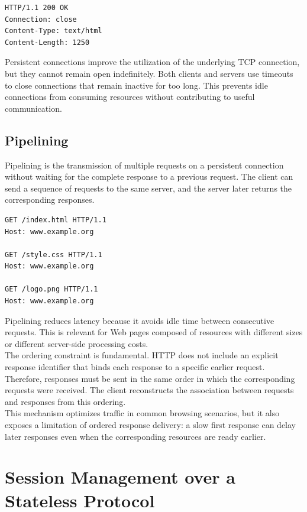 \documentclass{scrbook}
\begin{document}
\begin{lstlisting}
HTTP/1.1 200 OK
Connection: close
Content-Type: text/html
Content-Length: 1250
\end{lstlisting}

Persistent connections improve the utilization of the underlying TCP connection, but they cannot remain open indefinitely. Both clients and servers use timeouts to close connections that remain inactive for too long. This prevents idle connections from consuming resources without contributing to useful communication.

\newpage
\subsection{Pipelining}

Pipelining is the transmission of multiple requests on a persistent connection without waiting for the complete response to a previous request. The client can send a sequence of requests to the same server, and the server later returns the corresponding responses.

\begin{lstlisting}
GET /index.html HTTP/1.1
Host: www.example.org

GET /style.css HTTP/1.1
Host: www.example.org

GET /logo.png HTTP/1.1
Host: www.example.org
\end{lstlisting}

Pipelining reduces latency because it avoids idle time between consecutive requests. This is relevant for Web pages composed of resources with different sizes or different server-side processing costs.\\

The ordering constraint is fundamental. HTTP does not include an explicit response identifier that binds each response to a specific earlier request. Therefore, responses must be sent in the same order in which the corresponding requests were received. The client reconstructs the association between requests and responses from this ordering.\\

This mechanism optimizes traffic in common browsing scenarios, but it also exposes a limitation of ordered response delivery: a slow first response can delay later responses even when the corresponding resources are ready earlier.

\section{Session Management over a Stateless Protocol}
\end{document}
